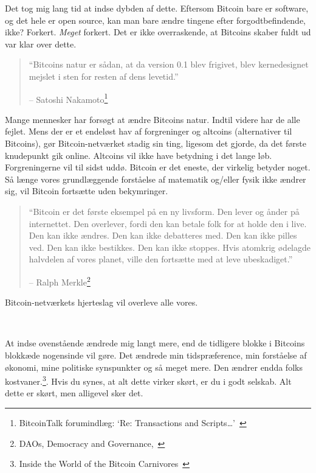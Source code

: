 \documentclass[paper=6in:9in,pagesize=pdftex,
               headinclude=on,footinclude=on,12pt]{scrbook}
\begin{document}
Det tog mig lang tid at indse dybden af dette. Eftersom Bitcoin bare er software, og det hele er open source, kan man bare ændre tingene efter forgodtbefindende, ikke? Forkert. \textit{Meget} forkert. Det er ikke overraskende, at Bitcoins skaber fuldt ud var klar over dette.\begin{quotation}\begin{samepage} \enquote{Bitcoins natur er sådan, at da version 0.1 blev frigivet, blev kernedesignet mejslet i sten for resten af dens levetid.} \begin{flushright} -- Satoshi Nakamoto\footnote{BitcoinTalk forumindlæg: `Re: Transactions and Scripts\ldots'~\cite{satoshi-set-in-stone}}
\end{flushright}\end{samepage}\end{quotation}

Mange mennesker har forsøgt at ændre Bitcoins natur. Indtil videre har de alle fejlet. Mens der er et endeløst hav af forgreninger og altcoins (alternativer til Bitcoins), gør Bitcoin-netværket stadig sin ting, ligesom det gjorde, da det første knudepunkt gik online. Altcoins vil ikke have betydning i det lange løb. Forgreningerne vil til sidst uddø. Bitcoin er det eneste, der virkelig betyder noget. Så længe vores grundlæggende forståelse af matematik og/eller fysik ikke ændrer sig, vil Bitcoin fortsætte uden bekymringer.\begin{quotation}\begin{samepage}
\enquote{Bitcoin er det første eksempel på en ny livsform. Den lever og ånder på internettet. Den overlever, fordi den kan betale folk for at holde den i live. Den kan ikke ændres. Den kan ikke debatteres med. Den kan ikke pilles ved. Den kan ikke bestikkes. Den kan ikke stoppes. Hvis atomkrig ødelagde halvdelen af vores planet, ville den fortsætte med at leve ubeskadiget.}
\begin{flushright} -- Ralph Merkle\footnote{DAOs, Democracy and Governance,~\cite{merkle-dao}}
\end{flushright}\end{samepage}\end{quotation}

Bitcoin-netværkets hjerteslag vil overleve alle vores.

~

At indse ovenstående ændrede mig langt mere, end de tidligere blokke i Bitcoins blokkæde nogensinde vil gøre. Det ændrede min tidspræference, min forståelse af økonomi, mine politiske synspunkter og så meget mere. Den ændrer endda folks kostvaner.\footnote{Inside the World of the Bitcoin Carnivores~\cite{carnivores}}. Hvis du synes, at alt dette virker skørt, er du i godt selskab. Alt dette er skørt, men alligevel sker det.
\end{document}

